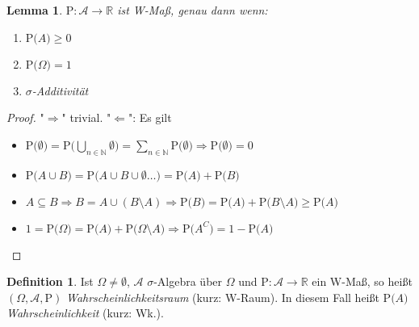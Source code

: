 \documentclass[a4paper,12pt,fleqn]{scrartcl}
\newcommand{\N}{\mathbb{N}}
\newcommand{\R}{\mathbb{R}}
\newcommand{\m}[1]{\mathcal{ #1 }}
\newcommand{\p}[1]{\text{P(} #1 \text{)}}
\newcommand{\impl}{\Rightarrow}
\theoremstyle{definition}
\newtheorem*{definition}{Definition}
\theoremstyle{plain}
\newtheorem*{lemma}{Lemma}
\theoremstyle{remark}
\begin{document}
\begin{lemma}
$\text{P}:\m{A}\to\R$ ist W-Maß, genau dann wenn:
\begin{enumerate}
\item $\p{A}\geq 0$
\item $\p{\Omega}=1$
\item $\sigma$-Additivität
\end{enumerate}
\end{lemma}
\begin{proof}
"$\impl$" trivial. "$\Leftarrow$": Es gilt
\begin{itemize}
\item $\p{\emptyset}=\p{\bigcup_{n\in\N}\emptyset}=\sum_{n\in\N}\p{\emptyset}\impl\p{\emptyset}=0$
\item $\p{ A\cup B}=\p{ A\cup B\cup\emptyset\ldots}=\p{ A}+\p{ B}$
\item $A\subseteq B\impl B=A\cup (B\setminus A)\impl\p{ B}=\p{A}+\p{B\setminus A}\geq\p{A}$
\item $1=\p{\Omega}=\p{A}+\p{\Omega\setminus A}\impl\p{A^C}=1-\p{A}$
\end{itemize}
\end{proof}
\begin{definition}
Ist $\Omega\neq\emptyset$, $\m{A}$ $\sigma$-Algebra über $\Omega$ und $\text{P}:\m{A}\to\R$ ein W-Maß, so heißt $(\Omega,\m{A},\text{P})$ \emph{Wahrscheinlichkeitsraum} (kurz: W-Raum). In diesem Fall heißt $\p{A}$ \emph{Wahrscheinlichkeit} (kurz: Wk.).
\end{definition}
\end{document}
